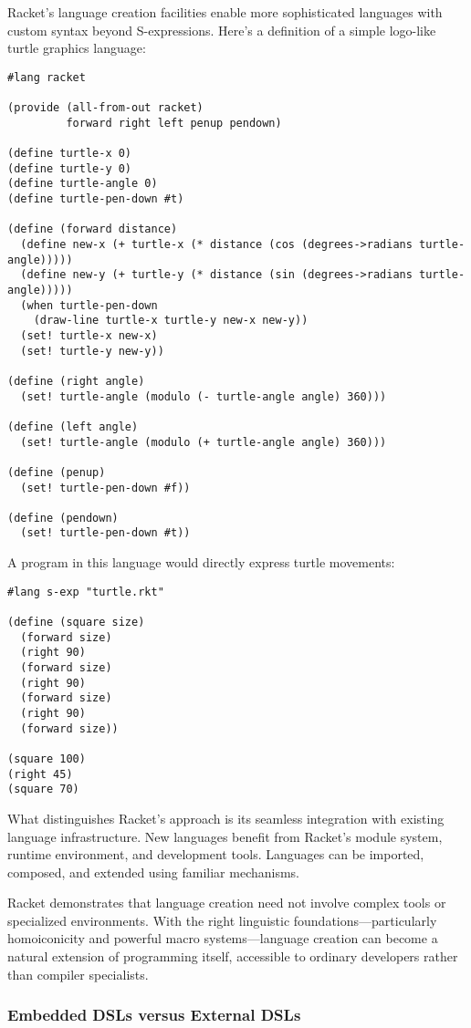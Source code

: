 \documentclass[11pt]{article}
\begin{document}
Racket's language creation facilities enable more sophisticated languages with custom syntax beyond S-expressions. Here's a definition of a simple logo-like turtle graphics language:

\begin{verbatim}
#lang racket

(provide (all-from-out racket)
         forward right left penup pendown)

(define turtle-x 0)
(define turtle-y 0)
(define turtle-angle 0)
(define turtle-pen-down #t)

(define (forward distance)
  (define new-x (+ turtle-x (* distance (cos (degrees->radians turtle-angle)))))
  (define new-y (+ turtle-y (* distance (sin (degrees->radians turtle-angle)))))
  (when turtle-pen-down
    (draw-line turtle-x turtle-y new-x new-y))
  (set! turtle-x new-x)
  (set! turtle-y new-y))

(define (right angle)
  (set! turtle-angle (modulo (- turtle-angle angle) 360)))

(define (left angle)
  (set! turtle-angle (modulo (+ turtle-angle angle) 360)))

(define (penup)
  (set! turtle-pen-down #f))

(define (pendown)
  (set! turtle-pen-down #t))
\end{verbatim}

A program in this language would directly express turtle movements:

\begin{verbatim}
#lang s-exp "turtle.rkt"

(define (square size)
  (forward size)
  (right 90)
  (forward size)
  (right 90)
  (forward size)
  (right 90)
  (forward size))

(square 100)
(right 45)
(square 70)
\end{verbatim}

What distinguishes Racket's approach is its seamless integration with existing language infrastructure. New languages benefit from Racket's module system, runtime environment, and development tools. Languages can be imported, composed, and extended using familiar mechanisms.

Racket demonstrates that language creation need not involve complex tools or specialized environments. With the right linguistic foundations—particularly homoiconicity and powerful macro systems—language creation can become a natural extension of programming itself, accessible to ordinary developers rather than compiler specialists.
\subsubsection{Embedded DSLs versus External DSLs}
\label{sec:org652b999}
\end{document}
